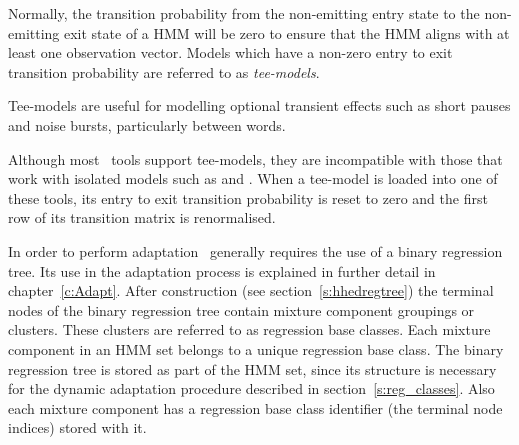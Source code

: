 Normally, the transition probability from the non-emitting entry
state to the non-emitting exit state of a HMM will be zero to ensure
that the HMM aligns with at least one observation vector.  
Models which have a non-zero entry to exit transition probability 
are referred to as {\it tee-models}.

Tee-models are useful for modelling optional transient effects
such as short pauses and noise bursts, particularly between words.

Although most \HTK\ tools support tee-models, they are incompatible with
those that work with isolated models such as  and
. When a tee-model is loaded into one of these tools, its
entry to exit transition probability is reset to zero and the first row of
its transition matrix is renormalised.



In order to perform adaptation \HTK\ generally requires the use of a
binary regression tree. Its use in the adaptation process is explained
in further detail in chapter~\ref{c:Adapt}.
After construction (see
section~\ref{s:hhedregtree}) the terminal nodes of the binary
regression tree contain mixture component groupings or
clusters. These clusters are referred to as regression base
classes. Each mixture component in an HMM set belongs to a unique
regression base class. The binary regression tree is stored as part of
the HMM set, since its structure is necessary for the dynamic
adaptation procedure described in section~\ref{s:reg_classes}. 
Also each mixture component has a regression base class identifier (the
terminal node indices) stored with it. 

